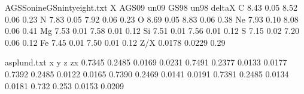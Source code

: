 \begin{filecontents}{AGSSonineGSnintyeight.txt}%
X AGS09 un09 GS98 un98 deltaX
C 8.43 0.05 8.52 0.06 0.23
N 7.83 0.05 7.92 0.06 0.23
O 8.69 0.05 8.83 0.06 0.38
Ne 7.93 0.10 8.08 0.06 0.41
Mg 7.53 0.01 7.58 0.01 0.12
Si 7.51 0.01 7.56 0.01 0.12
S 7.15 0.02 7.20 0.06 0.12
Fe 7.45 0.01 7.50 0.01 0.12
Z/X 0.0178 0.0229 0.29
\end{filecontents}


\begin{filecontents}{asplund.txt}%
x y z zx%
0.7345 0.2485 0.0169 0.0231%
0.7491 0.2377 0.0133 0.0177%
0.7392 0.2485 0.0122 0.0165%
0.7390 0.2469 0.0141 0.0191%
0.7381 0.2485 0.0134 0.0181%
0.732 0.253 0.0153 0.0209
\end{filecontents}

